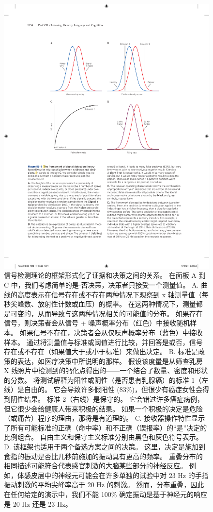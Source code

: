 \begin{figure}[htbp]
	\centering
	\includegraphics[width=0.7\linewidth]{chap56/fig_56_1}
	\caption{信号检测理论的框架形式化了证据和决策之间的关系。 在面板 A 到 C 中，我们考虑简单的是-否决策，决策者只接受一个测量值。 A. 曲线的高度表示在信号存在或不存在两种情况下观察到 x 轴测量值（每秒尖峰数、放射性计数或血压）的概率。 在这两种情况下，测量都是可变的，从而导致与这两种情况相关的可能值的分布。 如果存在信号，则决策者会从信号 + 噪声概率分布（红色）中接收随机样本。 如果信号不存在，决策者会从仅噪声概率分布（蓝色）中接收样本。 通过将测量值与标准或阈值进行比较，并回答是或否，信号存在或不存在（如果值大于或小于标准）来做出决定。 B. 标准是政策的表达，如医疗决策中所说明的那样。 假设该度量是从筛查乳房 X 线照片中检测到的钙化点得出的——一个结合了数量、密度和形状的分数。 将测试解释为阳性或阴性（是否患有乳腺癌）的标准 1（左线）是自由的。 它会导致许多假阳性 (83\%)，但很少有癌症女性会得到阴性结果。 标准 2（右线）是保守的。 它会错过许多癌症病例，但它很少会给健康人带来积极的结果。 如果一个积极的决定是危险（或痛苦）程序的理由，那将是有道理的。 C. 接收器操作特性显示了所有可能标准的正确（命中率）和不正确（误报率）的“是”决定的比例组合。 自由主义和保守主义标准分别由黑色和灰色符号表示。 D. 该框架也适用于两个备选方案之间的决策。 这里，决定是施加到食指的振动是否比几秒前施加的振动具有更高的频率。 重叠分布的相同描述可能符合代表感官刺激的大脑某些部分的神经反应。 例如，体感皮层中的神经元可能会在许多单独的试验中对 23 Hz 的手指振动刺激的平均尖峰率高于 20 Hz 的刺激。 然而，分布重叠，因此在任何给定的演示中，我们不能 100\% 确定振动是基于神经元的响应是 20 Hz 还是 23 Hz。}
	\label{fig:56_1}
\end{figure}

